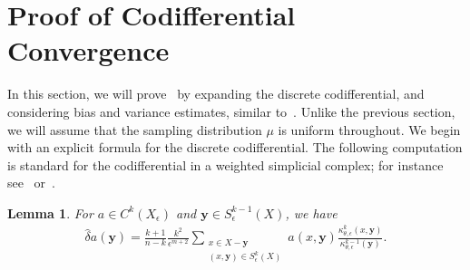 \documentclass[11pt,reqno]{amsproc}
\numberwithin{equation}{section}
\newcommand{\by}{\mathbf{y}}
\newcommand{\hdelta}{\hat{\delta}}
\newtheorem{lemma}[counter]{Lemma}
\theoremstyle{definition}
\theoremstyle{plain}
\begin{document}
\section{Proof of Codifferential Convergence} \label{sec:codiff_proof}

In this section, we will prove~ by expanding the discrete codifferential, and considering bias and variance estimates, similar to~. Unlike the previous section, we will assume that the sampling distribution $\mu$ is uniform throughout. We begin with an explicit formula for the discrete codifferential. The following computation is standard for the codifferential in a weighted simplicial complex; for instance see~\cite{horak_spectra_2013} or~\cite[Lemma 3.6]{ennaceur_hodge_2025}.


\begin{lemma} \label{lem:discrete_codifferential_formula}
    For $a \in C^k(X_\epsilon)$ and $\by \in S^{k-1}_\epsilon(X)$, we have
    \begin{align} \label{eq:discrete_codifferential_formula}
    \hdelta a(\by) = \frac{k+1}{n-k} \frac{k^2}{\epsilon^{m+2}} \sum_{\substack{x \in X - \by\\ (x,\by)\in S^k_\epsilon(X)}} a(x,\by) \frac{\kappa_{\theta,\epsilon}^k(x,\by)}{\kappa_{\theta,\epsilon}^{k-1}(\by)}.
    \end{align}
\end{lemma}
\end{document}
